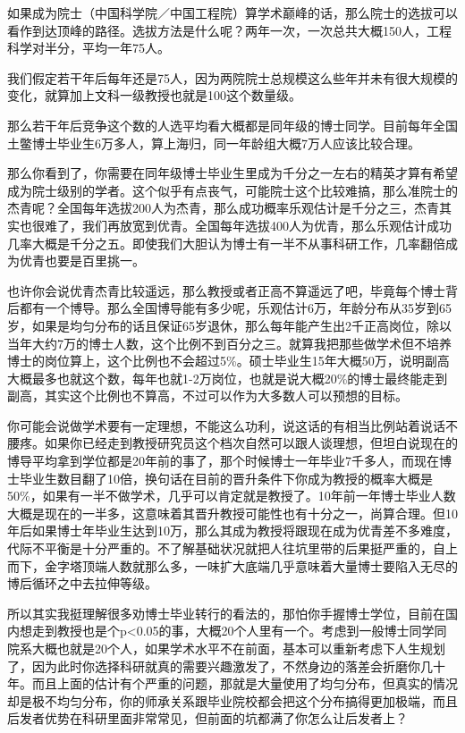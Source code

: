 \documentclass[]{tufte-book}
\begin{document}
如果成为院士（中国科学院／中国工程院）算学术巅峰的话，那么院士的选拔可以看作到达顶峰的路径。选拔方法是什么呢？两年一次，一次总共大概150人，工程科学对半分，平均一年75人。

我们假定若干年后每年还是75人，因为两院院士总规模这么些年并未有很大规模的变化，就算加上文科一级教授也就是100这个数量级。

那么若干年后竞争这个数的人选平均看大概都是同年级的博士同学。目前每年全国土鳖博士毕业生6万多人，算上海归，同一年龄组大概7万人应该比较合理。

那么你看到了，你需要在同年级博士毕业生里成为千分之一左右的精英才算有希望成为院士级别的学者。这个似乎有点丧气，可能院士这个比较难搞，那么准院士的杰青呢？全国每年选拔200人为杰青，那么成功概率乐观估计是千分之三，杰青其实也很难了，我们再放宽到优青。全国每年选拔400人为优青，那么乐观估计成功几率大概是千分之五。即使我们大胆认为博士有一半不从事科研工作，几率翻倍成为优青也要是百里挑一。

也许你会说优青杰青比较遥远，那么教授或者正高不算遥远了吧，毕竟每个博士背后都有一个博导。那么全国博导能有多少呢，乐观估计6万，年龄分布从35岁到65岁，如果是均匀分布的话且保证65岁退休，那么每年能产生出2千正高岗位，除以当年大约7万的博士人数，这个比例不到百分之三。就算我把那些做学术但不培养博士的岗位算上，这个比例也不会超过5\%。硕士毕业生15年大概50万，说明副高大概最多也就这个数，每年也就1-2万岗位，也就是说大概20\%的博士最终能走到副高，其实这个比例也不算高，不过可以作为大多数人可以预想的目标。

你可能会说做学术要有一定理想，不能这么功利，说这话的有相当比例站着说话不腰疼。如果你已经走到教授研究员这个档次自然可以跟人谈理想，但坦白说现在的博导平均拿到学位都是20年前的事了，那个时候博士一年毕业7千多人，而现在博士毕业生数目翻了10倍，换句话在目前的晋升条件下你成为教授的概率大概是50\%，如果有一半不做学术，几乎可以肯定就是教授了。10年前一年博士毕业人数大概是现在的一半多，这意味着其晋升教授可能性也有十分之一，尚算合理。但10年后如果博士年毕业生达到10万，那么其成为教授将跟现在成为优青差不多难度，代际不平衡是十分严重的。不了解基础状况就把人往坑里带的后果挺严重的，自上而下，金字塔顶端人数就那么多，一味扩大底端几乎意味着大量博士要陷入无尽的博后循环之中去拉伸等级。

所以其实我挺理解很多劝博士毕业转行的看法的，那怕你手握博士学位，目前在国内想走到教授也是个p\textless{}0.05的事，大概20个人里有一个。考虑到一般博士同学同院系大概也就是20个人，如果学术水平不在前面，基本可以重新考虑下人生规划了，因为此时你选择科研就真的需要兴趣激发了，不然身边的落差会折磨你几十年。而且上面的估计有个严重的问题，那就是大量使用了均匀分布，但真实的情况却是极不均匀分布，你的师承关系跟毕业院校都会把这个分布搞得更加极端，而且后发者优势在科研里面非常常见，但前面的坑都满了你怎么让后发者上？
\end{document}
